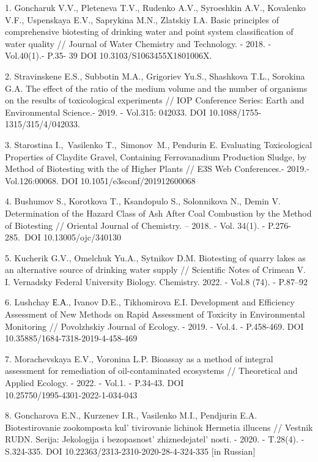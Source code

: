 \begin{refs}
1. Goncharuk V.V., Pleteneva T.V., Rudenko A.V., Syroeshkin A.V.,
Kovalenko V.F., Uspenskaya E.V., Saprykina M.N., Zlatskiy I.A. Basic
principles of comprehensive biotesting of drinking water and point
system classification of water quality // Journal of Water Chemistry and
Technology. - 2018. - Vol.40(1).- P.35- 39 DOI
10.3103/S1063455X1801006X.

2. Stravinskene E.S., Subbotin M.A., Grigoriev Yu.S., Shashkova T.L.,
Sorokina G.A. The effect of the ratio of the medium volume and the
number of organisms on the results of toxicological experiments // IOP
Conference Series: Earth and Environmental Science.- 2019. - Vol.315:
042033. DOI 10.1088/1755- 1315/315/4/042033.

3. Starostina I.,~Vasilenko T.,~Simonov~M., Pendurin E. Evaluating
Toxicological Properties of Claydite Gravel, Containing Ferrovanadium
Production Sludge, by Method of Biotesting with the of Higher
Plants // E3S Web Conferences.- 2019.- Vol.126:00068.
DOI 10.1051/e3sconf/201912600068

4. Bushumov S., Korotkova T., Ksandopulo S., Solonnikova N., Demin V.
Determination of the Hazard Class of Ash After Coal Combustion by the
Method of Biotesting // Oriental Journal of Chemistry. -- 2018. - Vol.
34(1). - P.276-285.~DOI 10.13005/ojc/340130~

5. Kucherik G.V., Omelchuk Yu.A., Sytnikov D.M. Biotesting of quarry
lakes as an alternative source of drinking water supply // Scientific
Notes of Crimean V. I. Vernadsky Federal University Biology. Chemistry.
2022. - Vol.8 (74). - P.87--92

6. Lushchay Е.А., Ivanov D.E., Tikhomirova E.I. Development and
Efficiency Assessment of New Meth\-ods on Rapid Assessment of Toxicity in
Environmental Monitoring // Povolzhskiy Journal of Ecology. - 2019. -
Vol.4. - P.458-469. DOI 10.35885/1684-7318-2019-4-458-469

7. Morachevskaya E.V., Voronina L.P. Bioassay as a method of integral
assessment for remediation of oil-contaminated ecosystems // Theoretical
and Applied Ecology. - 2022. - Vol.1. - P.34-43. DOI\\
10.25750/1995-4301-2022-1-034-043

8. Goncharova E.N., Kurzenev I.R., Vasilenko M.I., Pendjurin E.A.
Biotestirovanie zookomposta kul' tivirovanie lichinok
Hermetia illucens // Vestnik RUDN. Serija: Jekologija i
bezopasnost'{} zhiznedejatel' nosti. -
2020. - T.28(4). - S.324-335. DOI 10.22363/2313-2310-2020-28-4-324-335
{[}in Russian{]}


\end{refs}
